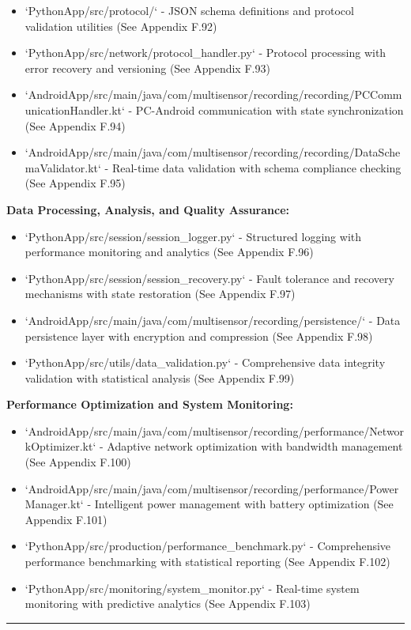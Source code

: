 \documentclass[12pt,a4paper]{report}
\begin{document}
\begin{itemize}
\item `PythonApp/src/protocol/` - JSON schema definitions and protocol validation utilities (See Appendix F.92)
\item `PythonApp/src/network/protocol_handler.py` - Protocol processing with error recovery and versioning (See Appendix
  F.93)
\item `AndroidApp/src/main/java/com/multisensor/recording/recording/PCCommunicationHandler.kt` - PC-Android communication
  with state synchronization (See Appendix F.94)
\item `AndroidApp/src/main/java/com/multisensor/recording/recording/DataSchemaValidator.kt` - Real-time data validation with
  schema compliance checking (See Appendix F.95)

\end{itemize}
\textbf{Data Processing, Analysis, and Quality Assurance:}

\begin{itemize}
\item `PythonApp/src/session/session_logger.py` - Structured logging with performance monitoring and analytics (See Appendix
  F.96)
\item `PythonApp/src/session/session_recovery.py` - Fault tolerance and recovery mechanisms with state restoration (See
  Appendix F.97)
\item `AndroidApp/src/main/java/com/multisensor/recording/persistence/` - Data persistence layer with encryption and
  compression (See Appendix F.98)
\item `PythonApp/src/utils/data_validation.py` - Comprehensive data integrity validation with statistical analysis (See
  Appendix F.99)

\end{itemize}
\textbf{Performance Optimization and System Monitoring:}

\begin{itemize}
\item `AndroidApp/src/main/java/com/multisensor/recording/performance/NetworkOptimizer.kt` - Adaptive network optimization
  with bandwidth management (See Appendix F.100)
\item `AndroidApp/src/main/java/com/multisensor/recording/performance/PowerManager.kt` - Intelligent power management with
  battery optimization (See Appendix F.101)
\item `PythonApp/src/production/performance_benchmark.py` - Comprehensive performance benchmarking with statistical
  reporting (See Appendix F.102)
\item `PythonApp/src/monitoring/system_monitor.py` - Real-time system monitoring with predictive analytics (See Appendix
  F.103)

\end{itemize}
\hrule
\end{document}
